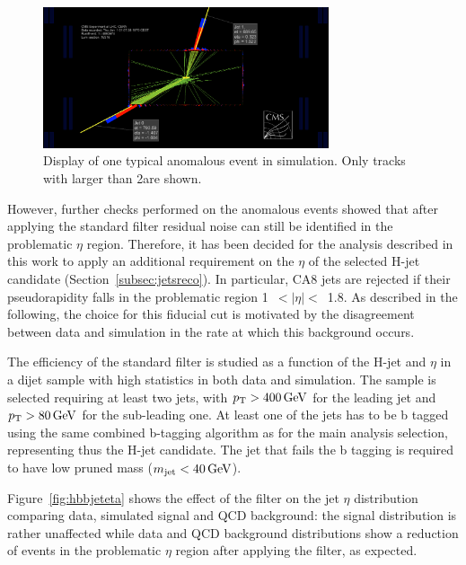 \begin{figure}[!htb]
\centering
\includegraphics[width=0.75\textwidth]{Appendix/Figures/MCevent-with-tobtec.png}
\caption{Display of one typical anomalous event in simulation.
Only tracks with \pt larger than 2\GeV are shown.}
\label{fig:BadEventMC}
\end{figure}

However, further checks performed on the anomalous events showed that after applying the standard filter 
residual noise can still be identified in the problematic $\eta$ region. Therefore, it has been decided for the analysis described in this work to
apply an additional requirement on the $\eta$ of the selected H-jet candidate (Section~\ref{subsec:jetsreco}).
In particular, CA8 jets are rejected if their pseudorapidity falls in the problematic region 1~$<|\eta|<$~1.8.
As described in the following, the choice for this fiducial cut is motivated by the disagreement between data and simulation in the rate
at which this background occurs.

The efficiency of the standard filter is studied as a function of the H-jet \pt and $\eta$ in a dijet sample with high statistics in both data and simulation.
The sample is selected requiring at least two jets, with $p_{\mathrm{T}} > 400\,\text{Ge\hspace{-.08em}V}$ for the leading jet and $p_{\mathrm{T}} > 80\,\text{Ge\hspace{-.08em}V}$ for the sub-leading one.
At least one of the jets has to be b tagged using the same combined b-tagging algorithm as for the main analysis selection, representing thus the H-jet candidate.
The jet that fails the b tagging is required to have low pruned mass ($m_{\text{jet}} < 40\,\text{Ge\hspace{-.08em}V}$).

Figure~\ref{fig:hbbjeteta} shows the effect of the filter on the jet $\eta$ distribution comparing data, simulated signal and QCD background:
the signal distribution is rather unaffected while data and QCD background distributions show a reduction of events in the problematic $\eta$ region after applying the filter, as expected.


